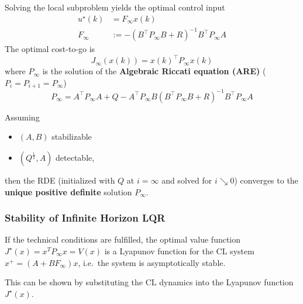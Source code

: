 Solving the local subproblem yields the optimal control input
\begin{align*}
    u^\star(k) & = F_\infty x(k)                                   \\
    F_\infty   & := -{(B^\top P_\infty B+R)}^{-1}B^\top P_\infty A
\end{align*}
The optimal cost-to-go is
\begin{equation*}
    J_\infty(x(k))={x(k)}^\top P_\infty x(k)
\end{equation*}
where $P_\infty$ is the solution of the \textbf{Algebraic Riccati equation (ARE)} ($P_i = P_{i+1} = P_{\infty}$)
\begin{equation*}
    P_\infty=A^\top P_\infty A+Q-A^\top P_\infty B{(B^\top P_\infty B+R)}^{-1}B^\top P_\infty A
\end{equation*}


\newpar{}

Assuming
\begin{itemize}
    \item $(A,B)$ stabilizable
    \item $(Q^{\frac{1}{2}}, A)$ detectable,
\end{itemize}
then the RDE (initialized with $Q$ at $i = \infty$ and solved for $i\searrow 0$) converges to the \textbf{unique positive definite} solution $P_{\infty}$.

\subsubsection{Stability of Infinite Horizon LQR}

If the technical conditions are fulfilled, the optimal value function $J^{\star} (x) = x^T P_{\infty} x = V(x)$ is a Lyapunov function for the CL system $x^+ = (A + BF_{\infty} )x$, i.e.\ the system is asymptotically stable.

This can be shown by substituting the CL dynamics into the Lyapunov function $J^{\star} (x)$.




